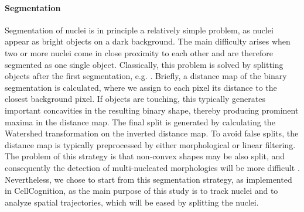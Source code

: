 \paragraph*{Segmentation}
Segmentation of nuclei is in principle a relatively simple problem, as
nuclei appear as bright objects on a dark background. The
main difficulty arises when two or more nuclei come in close proximity
to each other and are therefore segmented as one single object. Classically,
this problem is solved by splitting objects after the first
segmentation, e.g. \cite{cellcognition}. 
Briefly, a distance map of the binary segmentation is
calculated, where we assign to each pixel its distance to the closest
background pixel. If objects are touching, this typically generates
important concavities in the resulting binary shape, thereby producing
prominent maxima in the distance map. The final split is generated by
calculating the Watershed transformation on the inverted distance
map. To avoid false splits, the distance map is typically preprocessed
by either morphological or linear filtering. The problem of this
strategy is that non-convex shapes may be also split, and consequently
the detection of multi-nucleated morphologies will be more
difficult \cite{Walter2010}. Nevertheless, we chose to start from this segmentation
strategy, as implemented in CellCognition, as the main purpose of this
study is to track nuclei and to analyze spatial trajectories, which
will be eased by splitting the nuclei. 



